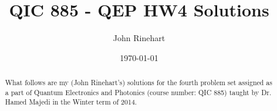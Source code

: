 \documentclass[aps,prl,preprint,groupedaddress]{revtex4-1}
\begin{document}

\title{QIC 885 - QEP HW4 Solutions}


\author{John Rinehart}


\date{\today}

\begin{abstract}
What follows are my (John Rinehart's) solutions for the fourth problem set assigned as a part of Quantum Electronics and Photonics (course number: QIC 885) taught by Dr. Hamed Majedi in the Winter term of 2014.
\end{abstract}

\pacs{}

\maketitle

\end{document}
